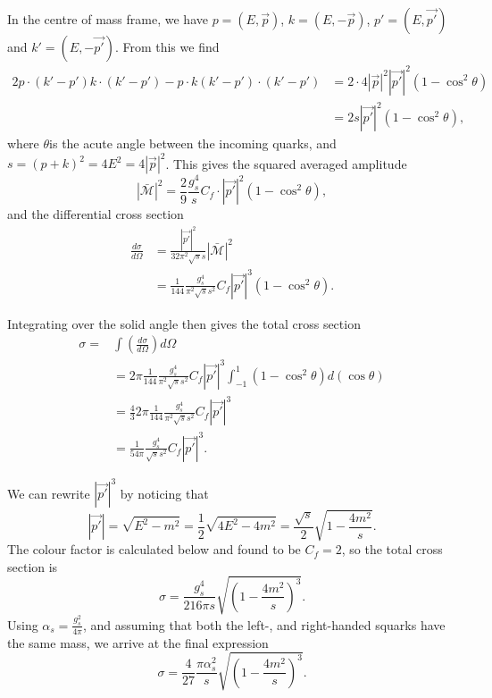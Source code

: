 \documentclass[notes.tex]{subfiles}
\begin{document}
\begin{Answer}
In the centre of mass frame, we have $p = (E,\vec{p})$, $k = (E,-\vec{p})$, $p' = (E,\vec{p'})$ and $k' = (E,-\vec{p'})$. From this we find
\begin{align*}
2p \cdot (k'-p') k\cdot (k'-p') - p\cdot k (k'-p') \cdot (k'-p') & = 2 \cdot 4|\vec{p}|^2|\vec{p'}|^2 (1- \cos^2 \theta)\\
& = 2s|\vec{p'}|^2 (1- \cos^2 \theta),
\end{align*}
where $\theta$is the acute angle between the incoming quarks, and $s = (p+k)^2 = 4E^2 = 4|\vec{p}|^2$. This gives the squared averaged amplitude
\begin{equation*}
|\bar{\mathcal{M}}|^2 = \frac{2}{9}\frac{g_s^4}{s}C_f \cdot |\vec{p'}|^2 (1- \cos^2 \theta),
\end{equation*}
and the differential cross section
\begin{align*}
\frac{d\sigma}{d\Omega} & = \frac{|\vec{p'}|^2}{32 \pi^2 \sqrt{s}s}|\bar{\mathcal{M}}|^2\\
& = \frac{1}{144}\frac{g_s^4}{\pi^2\sqrt{s}s^2}C_f |\vec{p'}|^3(1-\cos^2\theta).
\end{align*}

Integrating over the solid angle then gives the total cross section
\begin{align*}
\sigma = & \int \left(\frac{d\sigma}{d\Omega}\right) d\Omega\\
& = 2\pi \frac{1}{144}\frac{g_s^4}{\pi^2\sqrt{s}s^2}C_f |\vec{p'}|^3\int_{-1}^{1}(1-\cos^2\theta) d(\cos\theta)\\
& = \frac{4}{3}2\pi \frac{1}{144}\frac{g_s^4}{\pi^2\sqrt{s}s^2}C_f |\vec{p'}|^3\\
& = \frac{1}{54\pi}\frac{g_s^4}{\sqrt{s}s^2}C_f |\vec{p'}|^3.
\end{align*}

We can rewrite $|\vec{p'}|^3$ by noticing that
\begin{equation*}
|\vec{p'}| =  \sqrt{E^2 - m^2} = \frac{1}{2}\sqrt{4E^2 - 4m^2} = \frac{\sqrt{s}}{2}\sqrt{1 - \frac{4m^2}{s}}.
\end{equation*}
The colour factor is calculated below and found to be $C_f = 2$, so the total cross section is
\begin{equation*}
\sigma = \frac{g_s^4}{216\pi s} \sqrt{\left(1-\frac{4m^2}{s}\right)^3}.
\end{equation*}
Using $\alpha_s = \frac{g_s^2}{4\pi}$, and assuming that both the left-, and right-handed squarks have the same mass, we arrive at the final expression
\begin{equation*}
\sigma = \frac{4}{27}\frac{\pi \alpha_s^2}{s}\sqrt{\left(1-\frac{4m^2}{s}\right)^3}.
\end{equation*}


\end{Answer}
\end{document}
